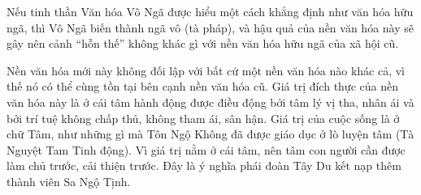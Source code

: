 Nếu tinh thần Văn hóa Vô Ngã được hiểu một cách khẳng định như văn hóa hữu ngã, thì Vô Ngã biến thành ngã vô (tà pháp), và hậu quả của nền văn hóa này sẽ gây nên cảnh ``hỗn thế'' không khác gì với nền văn hóa hữu ngã của xã hội cũ.

Nền văn hóa mới này không đối lập với bất cứ một nền văn hóa nào khác cả, vì thế nó có thể cùng tồn tại bên cạnh nền văn hóa cũ. Giá trị đích thực của nền văn hóa này là ở cái tâm hành động được điều động bởi tâm lý vị tha, nhân ái và bởi trí tuệ không chấp thủ, không tham ái, sân hận. Giá trị của cuộc sống là ở chữ Tâm, như những gì mà Tôn Ngộ Không đã được giáo dục ở lò luyện tâm (Tà Nguyệt Tam Tinh động). Vì giá trị nằm ở cái tâm, nên tâm con người cần được làm chủ trước, cải thiện trước. Đây là ý nghĩa phái đoàn Tây Du kết nạp thêm thành viên Sa Ngộ Tịnh.
